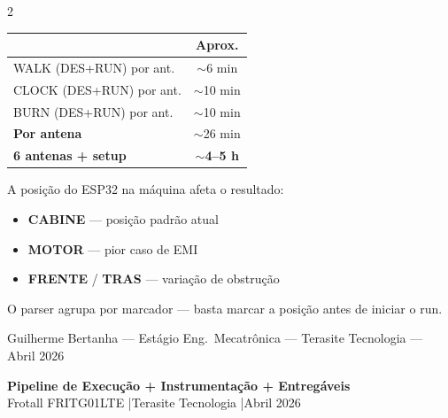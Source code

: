 \documentclass[a4paper,10pt]{article}
\begin{document}
\begin{multicols}{2}

\begin{tcolorbox}[cxam, title={Tempo estimado}]
\small
\begin{tabular}{lc}
\toprule & \textbf{Aprox.} \\ \midrule
WALK (DES+RUN) por ant. & $\sim$6 min \\
CLOCK (DES+RUN) por ant. & $\sim$10 min \\
BURN (DES+RUN) por ant. & $\sim$10 min \\
\midrule
\textbf{Por antena} & $\sim$26 min \\
\textbf{6 antenas + setup} & \textbf{$\sim$4--5 h} \\
\bottomrule
\end{tabular}
\end{tcolorbox}

\columnbreak

\begin{tcolorbox}[cxt, title={Pontos de instalação}]
\small
A posição do ESP32 na máquina afeta o resultado:
\begin{itemize}[leftmargin=*,itemsep=1pt,topsep=2pt]
  \item[\textbullet] \textbf{CABINE} --- posição padrão atual
  \item[\textbullet] \textbf{MOTOR} --- pior caso de EMI
  \item[\textbullet] \textbf{FRENTE} / \textbf{TRAS} --- variação de obstrução
\end{itemize}
\vspace{1pt}
{\color{tscinza}\footnotesize O parser agrupa por marcador --- basta marcar a
posição antes de iniciar o run.}
\end{tcolorbox}

\end{multicols}

\vspace{3pt}
\begin{center}
{\footnotesize\color{tscinza}
Guilherme Bertanha --- Estágio Eng.\ Mecatrônica ---
Terasite Tecnologia --- Abril 2026}
\end{center}

\newpage

\begin{tcolorbox}[
  enhanced, arc=5pt, boxrule=0pt,
  left=12pt, right=12pt, top=7pt, bottom=7pt,
  interior style={left color=tsazul, right color=tsteal},
  colframe=tsazul,
]
  \color{white}
  {\normalsize\bfseries Pipeline de Execução + Instrumentação + Entregáveis}\\[-1pt]
  {\small Frotall FRITG01LTE \quad|\quad Terasite Tecnologia \quad|\quad Abril 2026}
\end{tcolorbox}
\end{document}
